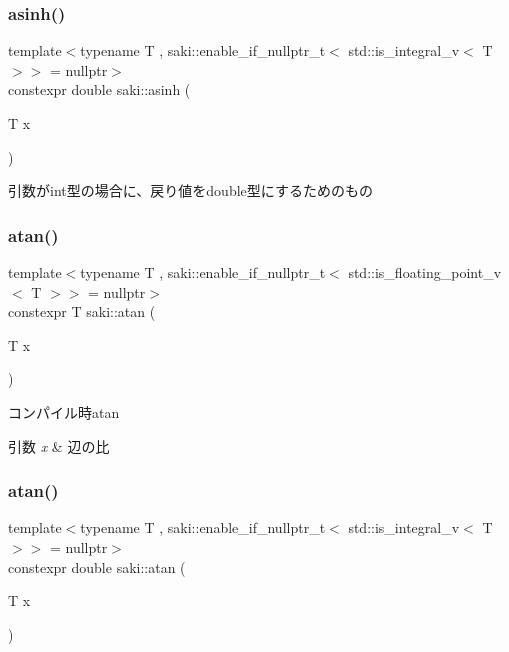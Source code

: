 \subsubsection{\texorpdfstring{asinh()}{asinh()}\hspace{0.1cm}{\footnotesize\ttfamily [2/2]}}
{\footnotesize\ttfamily template$<$typename T , saki\+::enable\+\_\+if\+\_\+nullptr\+\_\+t$<$ std\+::is\+\_\+integral\+\_\+v$<$ T $>$$>$  = nullptr$>$ \\
constexpr double saki\+::asinh (\begin{DoxyParamCaption}\item[{T}]{x }\end{DoxyParamCaption})}



引数がint型の場合に、戻り値をdouble型にするためのもの 

\mbox{\label{namespacesaki_a524b9439c745f69bd8a8b681b03b4b01}} 
\subsubsection{\texorpdfstring{atan()}{atan()}\hspace{0.1cm}{\footnotesize\ttfamily [1/2]}}
{\footnotesize\ttfamily template$<$typename T , saki\+::enable\+\_\+if\+\_\+nullptr\+\_\+t$<$ std\+::is\+\_\+floating\+\_\+point\+\_\+v$<$ T $>$$>$  = nullptr$>$ \\
constexpr T saki\+::atan (\begin{DoxyParamCaption}\item[{T}]{x }\end{DoxyParamCaption})}



コンパイル時atan 


\begin{DoxyParams}{引数}
{\em x} & 辺の比 \\
\hline
\end{DoxyParams}
\mbox{\label{namespacesaki_acd8a08085fc9210a4e8d61f6c04febe2}} 
\subsubsection{\texorpdfstring{atan()}{atan()}\hspace{0.1cm}{\footnotesize\ttfamily [2/2]}}
{\footnotesize\ttfamily template$<$typename T , saki\+::enable\+\_\+if\+\_\+nullptr\+\_\+t$<$ std\+::is\+\_\+integral\+\_\+v$<$ T $>$$>$  = nullptr$>$ \\
constexpr double saki\+::atan (\begin{DoxyParamCaption}\item[{T}]{x }\end{DoxyParamCaption})}



